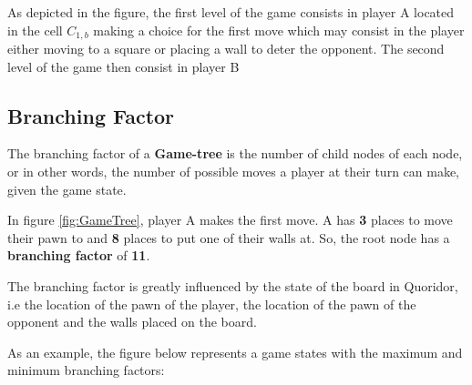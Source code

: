 As depicted in the figure, the first level of the game consists in player A located in the cell $C_{1, b}$ making a choice for the first move which may consist in the player either moving to a square or placing a wall to deter the opponent. The second level of the game then consist in player B  


\subsection{Branching Factor}
\label{BranchingFactor}

The branching factor of a \textbf{Game-tree} is the number of child nodes of each node, or in other words, the number of possible moves a player at their turn can make, given the game state.

In figure \ref{fig:GameTree}, player A makes the first move. A has \textbf{3} places to move their pawn to and \textbf{8} places to put one of their walls at. So, the root node has a \textbf{branching factor} of \textbf{11}.

The branching factor is greatly influenced by the state of the board in Quoridor, i.e the location of the pawn of the player, the location of the pawn of the opponent and the walls placed on the board.

As an example, the figure below represents a game states with the maximum and minimum branching factors:

